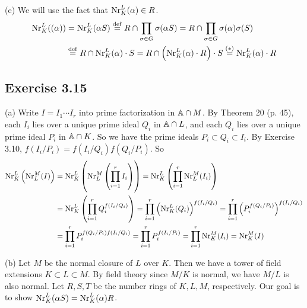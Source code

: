 \documentclass[../Marcus.tex]{subfiles}
\begin{document}
(e) We will use the fact that $\Nr^L_K(\alpha)\in R$.
\begin{align*}
    \Nr^L_K((\alpha))
	&= \Nr^L_K(\alpha S)
	\overset{\df}{=} R\cap \prod_{\sigma\in G}\sigma(\alpha S)
	= R\cap \prod_{\sigma\in G}\sigma(\alpha)\sigma(S)    \\
    &\overset{\df}{=} R\cap \Nr^L_K(\alpha)\cdot S
	= R\cap\left(\Nr^L_K(\alpha)\cdot R\right)\cdot S
    \overset{(*)}{=} \Nr^L_K(\alpha)\cdot R
\end{align*}

\subsection*{Exercise 3.15}

(a) Write $I=I_1\cdots I_r$ into prime factorization in $\AA\cap M$. By Theorem 20 (p. 45), each $I_i$ lies over a unique prime ideal $Q_i$ in $\AA\cap L$, and each $Q_i$ lies over a unique prime ideal $P_i$ in $\AA\cap K$. So we have the prime ideals $P_i\subset Q_i\subset I_i$. By Exercise 3.10, $f(I_i/P_i)=f(I_i/Q_i)f(Q_i/P_i)$. So
\begin{align*}
    \Nr^L_K\left(\Nr^M_L(I)\right)
	&= \Nr^L_K\left(\Nr^M_L\left(\prod_{i=1}^r I_i\right)\right)
	= \Nr^L_K\left(\prod_{i=1}^r \Nr^M_L(I_i)\right)     \\ 
    &= \Nr^L_K\left(\prod_{i=1}^r Q_i^{f(I_i/Q_i)}\right)
	= \prod_{i=1}^r \left(\Nr^L_K(Q_i)\right)^{f(I_i/Q_i)}
	= \prod_{i=1}^r \left(P_i^{f(Q_i/P_i)}\right)^{f(I_i/Q_i)}      \\
    &= \prod_{i=1}^r P_i^{f(Q_i/P_i)f(I_i/Q_i)}
	= \prod_{i=1}^r P_i^{f(I_i/P_i)}
	= \prod_{i=1}^r \Nr^M_K(I_i)
	= \Nr^M_K(I)
\end{align*}

(b) Let $M$ be the normal closure of $L$ over $K$. Then we have a tower of field extensions $K\subset L\subset M$. By field theory since $M/K$ is normal, we have $M/L$ is also normal. Let $R,S,T$ be the number rings of $K,L,M$, respectively. Our goal is to show $\Nr^L_K(\alpha S)=\Nr^L_K(\alpha)R$.
\end{document}
